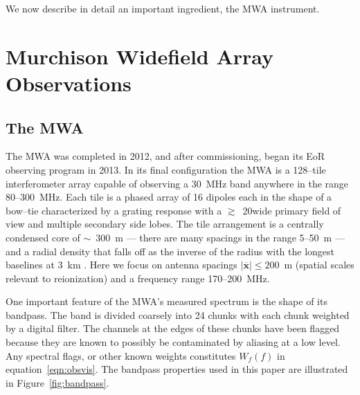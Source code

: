 \documentclass[preprint2,iop,numberedappendix]{emulateapj}
\begin{document}
We now describe in detail an important ingredient, the MWA instrument.

\section{Murchison Widefield Array Observations}\label{sec:instrument}

\subsection{The MWA}

The MWA was completed in 2012, and after commissioning, began its EoR observing program in 2013. In its final configuration the MWA is a 128--tile interferometer array capable of observing a 30~MHz band anywhere in the range 80--300~MHz. Each tile is a phased array of 16 dipoles each in the shape of a bow--tie characterized by a grating response with a $\gtrsim$~20\arcdeg wide primary field of view and multiple secondary side lobes. The tile arrangement is a centrally condensed core of $\sim$~300~m --- there are many spacings in the range 5--50~m --- and a radial density that falls off as the inverse of the radius with the longest baselines at 3~km \citep{bea12}. Here we focus on antenna spacings $|\overline{\mathbf{x}}| \le 200$~m (spatial scales relevant to reionization) and a frequency range 170--200~MHz.

One important feature of the MWA's measured spectrum is the shape of its bandpass. The band is divided coarsely into 24 chunks with each chunk weighted by a digital filter. The channels at the edges of these chunks have been flagged because they are known to possibly be contaminated by aliasing at a low level. Any spectral flags, or other known weights constitutes $W_f(f)$ in equation~\ref{eqn:obsvis}. The bandpass properties used in this paper are illustrated in Figure~\ref{fig:bandpass}. 
\end{document}
